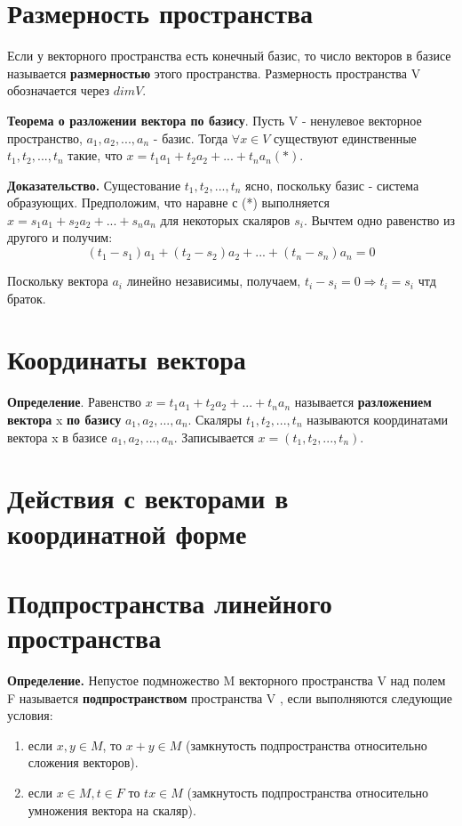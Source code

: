\documentclass[a4paper]{article}
\begin{document}
{\begin{small}
\section*{Размерность пространства}
Если у векторного пространства есть конечный базис, то число векторов в базисе называется \textbf{размерностью} этого пространства.
Размерность пространства V обозначается через $dim V$.

\textbf{Теорема о разложении вектора по базису}. Пусть V - ненулевое векторное пространство, $a_1, a_2, ..., a_n$ - базис. Тогда $\forall x \in V$ существуют единственные $t_1, t_2, ..., t_n$ такие, что $x = t_1a_1 + t_2a_2 + ... + t_na_n (*)$.

\textbf{Доказательство.} Сущестование $t_1, t_2, ..., t_n$ ясно, поскольку базис - система образующих. Предположим, что наравне с (*) выполняется $x = s_1a_1 + s_2a_2 + ... + s_na_n$ для некоторых скаляров $s_i$. Вычтем одно равенство из другого и получим: \begin{equation}
(t_1-s_1)a_1 + (t_2-s_2)a_2 + ... + (t_n-s_n)a_n = 0
\end{equation}

Поскольку вектора $a_i$ линейно независимы, получаем, $t_i-s_i = 0 \Rightarrow t_i = s_i$ чтд браток.



\section*{Координаты вектора}
\textbf{Определение}. Равенство $x = t_1a_1 + t_2a_2 + ... + t_na_n$ называется \textbf{разложением вектора }
x \textbf{по базису} $a_1, a_2, ..., a_n$. Скаляры $t_1, t_2, ..., t_n$ называются координатами вектора x в базисе $a_1, a_2, ..., a_n$. Записывается $x = (t_1, t_2, ..., t_n)$. 

\section*{Действия с векторами в координатной форме}



\section*{Подпространства линейного пространства}
\textbf{Определение.} Непустое подмножество M векторного пространства V над полем F
называется \textbf{подпространством} пространства V , если выполняются
следующие условия:
\begin{enumerate}
\item если $x,y \in M$, то $x+y \in M$ (замкнутость подпространства относительно сложения векторов).
\item если $x \in M, t \in F$ то $tx \in M$ (замкнутость подпространства относительно умножения вектора на скаляр).
\end{enumerate}



\end{small}}
\end{document}
